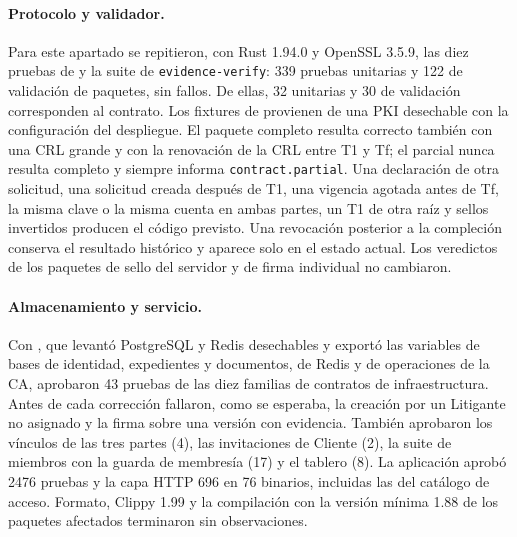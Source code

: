 \paragraph{Protocolo y validador.} Para este apartado se repitieron, con Rust
1.94.0 y OpenSSL 3.5.9, las diez pruebas de
 y la suite de
\texttt{evidence-verify}: 339 pruebas unitarias y 122 de validación de
paquetes, sin fallos. De ellas, 32 unitarias y 30 de validación corresponden
al contrato. Los fixtures de 
provienen de una PKI desechable con la configuración del despliegue. El paquete
completo resulta correcto también con una CRL grande y con la renovación de la
CRL entre T1 y Tf; el parcial nunca resulta completo y siempre informa
\texttt{contract.partial}. Una declaración de otra solicitud, una solicitud
creada después de T1, una vigencia agotada antes de Tf, la misma clave o la
misma cuenta en ambas partes, un T1 de otra raíz y sellos invertidos producen
el código previsto. Una revocación posterior a la compleción conserva el
resultado histórico y aparece solo en el estado actual. Los veredictos de los
paquetes de sello del servidor y de firma individual no cambiaron.

\paragraph{Almacenamiento y servicio.} Con
, que levantó PostgreSQL y Redis desechables
y exportó las variables de bases de identidad, expedientes y documentos, de
Redis y de operaciones de la CA, aprobaron 43 pruebas de las diez familias de
contratos de infraestructura. Antes de cada corrección fallaron, como se
esperaba, la creación por un Litigante no asignado y la firma sobre una
versión con evidencia. También aprobaron los vínculos de las tres partes
(4), las invitaciones de Cliente (2), la suite de miembros con la guarda de
membresía (17) y el tablero (8). La aplicación aprobó 2476 pruebas y la capa
HTTP 696 en 76 binarios, incluidas las del catálogo de acceso. Formato,
Clippy 1.99 y la compilación con la versión mínima 1.88 de los paquetes
afectados terminaron sin observaciones.

